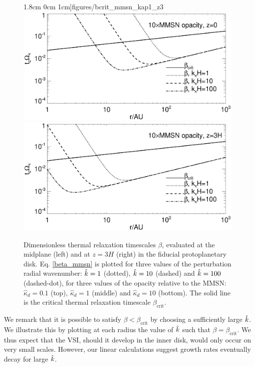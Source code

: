 \begin{figure}
  1.8cm 0cm 1cm]{figures/bcrit_mmsn_kap1_z3}\\
  \includegraphics[scale=.47,clip=true,trim=0cm 0cm 0cm
  1cm]{figures/bcrit_mmsn_kap10_z0}\includegraphics[scale=.47,clip=true,trim=2.5cm 0cm 0cm
  1cm]{figures/bcrit_mmsn_kap10_z3} 
  \caption{Dimensionless thermal relaxation timescales $\beta$,
    evaluated at the midplane (left) and at $z=3H$ (right) in the
    fiducial protoplanetary disk. Eq. \ref{beta_mmsn} is plotted  
    for three values of the 
    perturbation radial wavenumber: $\hat{k}=1$ (dotted), $\hat{k}=10$
    (dashed) and $\hat{k}=100$ (dashed-dot), for three values of the
    opacity relative to the MMSN: $\hat{\kappa}_d=0.1$ (top),
    $\hat{\kappa}_d=1$ (middle) and $\hat{\kappa}_d=10$ (bottom).  
    The solid line is the 
    critical thermal relaxation timescale $\beta_\mathrm{crit}$. 
    \label{mmsn_bcrit_bcool}}   
\end{figure}  

We remark that it is possible to satisfy $\beta < \beta_\mathrm{crit}$
by choosing a sufficiently large $\hat{k}$. We
illustrate this by plotting at each radius the value of $\hat{k}$ such
that $\beta = \beta_\mathrm{crit}$. We thus expect that the VSI,
should it develop in the inner disk, would only occur on very small
scales. However, our linear calculations suggest growth rates
eventually decay for large $\hat{k}$. 

